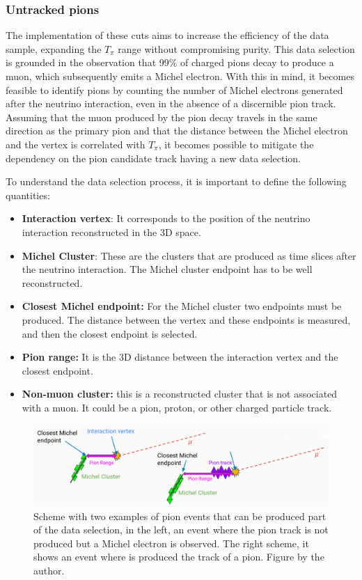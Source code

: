 \subsubsection{Untracked pions}
\label{Cap:Analysis:DataSelection:Cuts:UntrackedPions}
The implementation of these cuts aims to increase the efficiency of the data sample, expanding the $T_\pi$ range without compromising purity. This data selection is grounded in the observation that 99\% of charged pions decay to produce a muon, which subsequently emits a Michel electron. With this in mind, it becomes feasible to identify pions by counting the number of Michel electrons generated after the neutrino interaction, even in the absence of a discernible pion track. Assuming that the muon produced by the pion decay travels in the same direction as the primary pion and that the distance between the Michel electron and the vertex is correlated with $T_\pi$, it becomes possible to mitigate the dependency on the pion candidate track having a new data selection. 

To understand the data selection process, it is important to define the following quantities:
\begin{itemize}
    \item \textbf{Interaction vertex}: It corresponds to the position of the neutrino interaction reconstructed in the 3D space. 
    \item \textbf{Michel Cluster}: These are the clusters that are produced as time slices after the neutrino interaction. The Michel cluster endpoint has to be well reconstructed. 
    \item \textbf{Closest Michel endpoint:} For the Michel cluster two endpoints must be produced. The distance between the vertex and these endpoints is measured, and then the closest endpoint is selected.
    \item \textbf{Pion range:} It is the 3D distance between the interaction vertex and the closest endpoint.
    \item \textbf{Non-muon cluster:} this is a reconstructed cluster that is not associated with a muon. It could be a pion, proton, or other charged particle track. 
\end{itemize}
\begin{figure}
    \centering
    \includegraphics[scale=0.33]{Figures/Chapter4/DataSelection/TracklessPions.png}
    \caption{Scheme with two examples of pion events that can be produced part of the data selection, in the left, an event where the pion track is not produced but a Michel electron is observed. The right scheme, it shows an event where is produced the track of a pion. Figure by the author. }
    \label{fig:Analysis:Cuts:Untracked:MichelEventSheme}
\end{figure}

